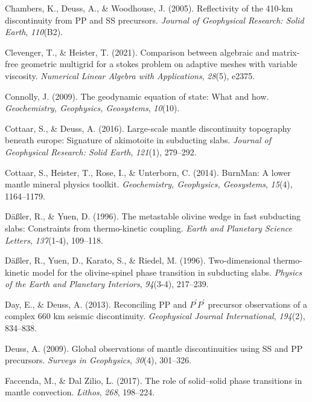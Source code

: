 \documentclass[draft,linenumbers]{agujournal2019}
\newlength{\cslhangindent}
\newenvironment{CSLReferences}[2]
 {\begin{list}{}{
  \setlength{\itemindent}{0pt}
  \setlength{\leftmargin}{0pt}
  \setlength{\parsep}{0pt}
  \ifodd #1
   \setlength{\leftmargin}{\cslhangindent}
   \setlength{\itemindent}{-\cslhangindent}
  \fi
  \setlength{\itemsep}{#2\baselineskip}
  }
  \item\relax}
 {\end{list}}
\begin{document}
\begin{CSLReferences}{1}{0}
Chambers, K., Deuss, A., \& Woodhouse, J. (2005). Reflectivity of the
410-km discontinuity from PP and SS precursors. \emph{Journal of
Geophysical Research: Solid Earth}, \emph{110}(B2).

Clevenger, T., \& Heister, T. (2021). Comparison between algebraic and
matrix-free geometric multigrid for a stokes problem on adaptive meshes
with variable viscosity. \emph{Numerical Linear Algebra with
Applications}, \emph{28}(5), e2375.

Connolly, J. (2009). The geodynamic equation of state: What and how.
\emph{Geochemistry, Geophysics, Geosystems}, \emph{10}(10).

Cottaar, S., \& Deuss, A. (2016). Large-scale mantle discontinuity
topography beneath europe: Signature of akimotoite in subducting slabs.
\emph{Journal of Geophysical Research: Solid Earth}, \emph{121}(1),
279--292.

Cottaar, S., Heister, T., Rose, I., \& Unterborn, C. (2014). BurnMan: A
lower mantle mineral physics toolkit. \emph{Geochemistry, Geophysics,
Geosystems}, \emph{15}(4), 1164--1179.

Däßler, R., \& Yuen, D. (1996). The metastable olivine wedge in fast
subducting slabs: Constraints from thermo-kinetic coupling. \emph{Earth
and Planetary Science Letters}, \emph{137}(1-4), 109--118.

Däßler, R., Yuen, D., Karato, S., \& Riedel, M. (1996). Two-dimensional
thermo-kinetic model for the olivine-spinel phase transition in
subducting slabs. \emph{Physics of the Earth and Planetary Interiors},
\emph{94}(3-4), 217--239.

Day, E., \& Deuss, A. (2013). Reconciling PP and {\(P^\prime P^\prime\)}
precursor observations of a complex 660 km seismic discontinuity.
\emph{Geophysical Journal International}, \emph{194}(2), 834--838.

Deuss, A. (2009). Global observations of mantle discontinuities using SS
and PP precursors. \emph{Surveys in Geophysics}, \emph{30}(4), 301--326.

Faccenda, M., \& Dal Zilio, L. (2017). The role of solid--solid phase
transitions in mantle convection. \emph{Lithos}, \emph{268}, 198--224.


\end{CSLReferences}
\end{document}
